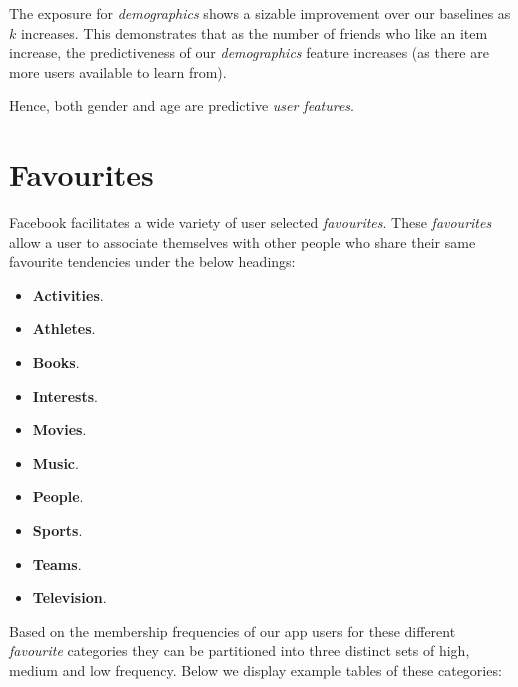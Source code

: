 The exposure for \emph{demographics} shows a sizable improvement over our baselines as $k$ increases. This demonstrates that as the
number of friends who like an item increase, the predictiveness of our \emph{demographics} feature increases (as there are more users available to learn from). 

Hence, both gender and age are predictive \emph{user features}.

\section{Favourites}
\label{sec:traits}

Facebook facilitates a wide variety of user selected \emph{favourites}. 
These \emph{favourites} allow a user to associate themselves with other people who share their same favourite tendencies under the below headings:

\begin{itemize}
\item \textbf{Activities}.
\item \textbf{Athletes}.
\item \textbf{Books}.
\item \textbf{Interests}.
\item \textbf{Movies}.
\item \textbf{Music}.
\item \textbf{People}.
\item \textbf{Sports}.
\item \textbf{Teams}.
\item \textbf{Television}.
\end{itemize}

Based on the membership frequencies of our app users for these different \emph{favourite} categories they can be partitioned into three 
distinct sets of high, medium and low frequency.
Below we display example tables of these categories: 

